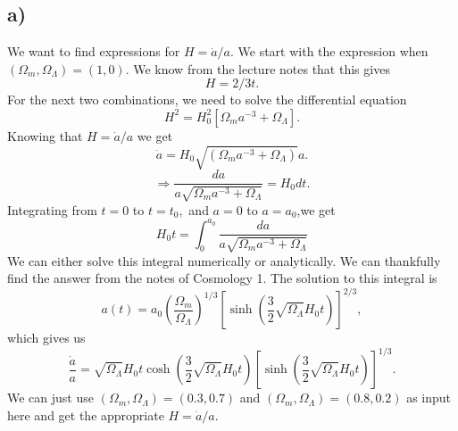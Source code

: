 \documentclass[a4paper,norsk, 10pt]{article}
\begin{document}
\subsection{a)}
We want to find expressions for $H = \dot{a}/a$. We start with the expression when $(\Omega_{m},\Omega_{\Lambda}) = (1,0)$. We know from the lecture notes that this gives
\begin{equation}\label{eq:o_m=1}
H = 2/3t.
\end{equation}
For the next two combinations, we need to solve the differential equation
\begin{equation}\label{eq:H^2}
H^2 = H_0^2\left[{\Omega_{m}}{a^{-3}} + \Omega_{\Lambda}\right].
\end{equation}
Knowing that $H=\dot{a}/a$ we get
\begin{equation}\label{eq:a_dot}
\dot{a} = H_0\sqrt{\left({\Omega_{m}}{a^{-3}} + \Omega_{\Lambda}\right)}a.
\end{equation}
\begin{equation}
\Rightarrow \frac{da}{a\sqrt{{\Omega_{m}}{a^{-3}} + \Omega_{\Lambda}}} = H_0dt.
\end{equation}
Integrating from $t = 0$ to $t=t_0,$ and $a=0$ to $a=a_0$,we get
\begin{equation}
H_0t =  \int_0^{a_0}\frac{da}{a\sqrt{{\Omega_{m}}{a^{-3}} + \Omega_{\Lambda}}}
\end{equation}
We can either solve this integral numerically or analytically. We can thankfully find the answer from the notes of Cosmology 1. The solution to this integral is
\begin{equation}
a(t) = a_0\left(\frac{\Omega_{m}}{\Omega_{\Lambda}}\right)^{1/3}\left[\sinh\left(\frac{3}{2}\sqrt{\Omega_{\Lambda}}H_0 t\right)\right]^{2/3},
\end{equation} 
which gives us
\begin{equation}\label{o_m<1}
\frac{\dot{a}}{a} = \sqrt{\Omega_{\Lambda}}H_0 t\cosh\left(\frac{3}{2}\sqrt{\Omega_{\Lambda}}H_0 t\right)\left[\sinh\left(\frac{3}{2}\sqrt{\Omega_{\Lambda}}H_0 t\right)\right]^{1/3}.
\end{equation}
We can just use $(\Omega_{m},\Omega_{\Lambda}) = (0.3,0.7)$ and $(\Omega_{m},\Omega_{\Lambda}) = (0.8,0.2)$ as input here and get the appropriate $H = \dot{a}/a$.
\end{document}

